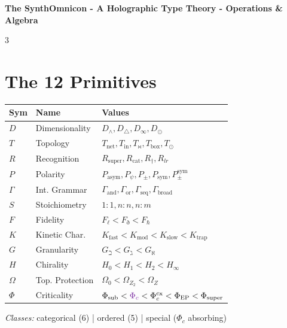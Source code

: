 \documentclass[8pt,a4paper,landscape]{article}
\newcommand{\cat}[1]{\textcolor{catblue}{#1}}
\newcommand{\ord}[1]{\textcolor{ordgreen}{#1}}
\newcommand{\spec}[1]{\textcolor{specpurple}{#1}}
\begin{document}
\begin{center}
\LARGE\textbf{The SynthOmnicon - A Holographic Type Theory - Operations \& Algebra}\\
\end{center}
\vspace{-0.3em}

\begin{multicols}{3}

\section*{The 12 Primitives}
\footnotesize
\renewcommand{\arraystretch}{1.1}
\begin{tabular}{@{}llp{3.8cm}@{}}
\toprule
\textbf{Sym} & \textbf{Name} & \textbf{Values} \\
\midrule
\cat{$D$} & Dimensionality & $D_\wedge,D_\triangle,D_\infty,D_\odot$ \\
\cat{$T$} & Topology & $T_{\text{net}},T_{\text{in}},T_\bowtie,T_{\text{box}},T_\odot$ \\
\cat{$R$} & Recognition & $R_{\text{super}},R_{\text{cat}},R_\dagger,R_{lr}$ \\
\cat{$P$} & Polarity & $P_{\text{asym}},P_\psi,P_\pm,P_{\text{sym}},P_\pm^{\text{sym}}$ \\
\cat{$\Gamma$} & Int. Grammar & $\Gamma_{\text{and}},\Gamma_{\text{or}},\Gamma_{\text{seq}},\Gamma_{\text{broad}}$ \\
\cat{$S$} & Stoichiometry & $1{:}1,n{:}n,n{:}m$ \\
\midrule
\ord{$F$} & Fidelity & $F_\ell<F_\eth<F_\hbar$ \\
\ord{$K$} & Kinetic Char. & $K_{\text{fast}}<K_{\text{mod}}<K_{\text{slow}}<K_{\text{trap}}$ \\
\ord{$G$} & Granularity & $G_\beth<G_\gimel<G_\aleph$ \\
\ord{$H$} & Chirality & $H_0<H_1<H_2<H_\infty$ \\
\ord{$\Omega$} & Top. Protection & $\Omega_0<\Omega_{Z_2}<\Omega_Z$ \\
\midrule
\spec{$\Phi$} & Criticality & $\Phi_{\text{sub}}<\spec{\Phi_c}<\Phi_c^{\text{cx}}<\Phi_{\text{EP}}<\Phi_{\text{super}}$ \\
\bottomrule
\end{tabular}
\renewcommand{\arraystretch}{1.0}

\vspace{0.6em}
\textit{Classes:} \cat{categorical (6)} | \ord{ordered (5)} | \spec{special ($\Phi_c$ absorbing)}


\end{multicols}
\end{document}
